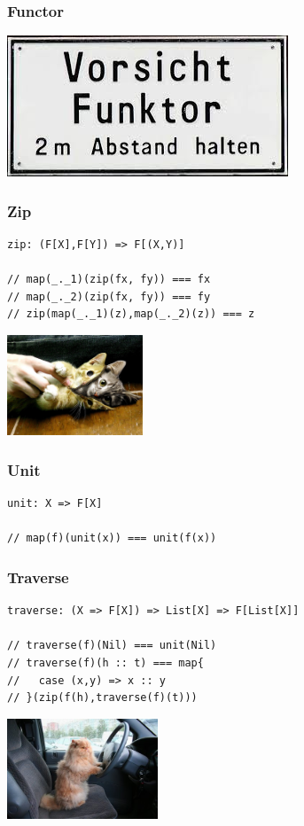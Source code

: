 \documentclass{beamer}
\begin{document}
\begin{frame}
\frametitle{Functor}
\includegraphics{funktor.jpeg}
\end{frame}

\begin{frame}[fragile]
\frametitle{Zip}
\begin{lstlisting}
zip: (F[X],F[Y]) => F[(X,Y)]

// map(_._1)(zip(fx, fy)) === fx
// map(_._2)(zip(fx, fy)) === fy
// zip(map(_._1)(z),map(_._2)(z)) === z
\end{lstlisting}
\begin{center} \includegraphics[height=3cm]{cat_zip.jpg} \end{center}
\end{frame}

\begin{frame}[fragile]
\frametitle{Unit}
\begin{lstlisting}
unit: X => F[X]

// map(f)(unit(x)) === unit(f(x))
\end{lstlisting}
\end{frame}

\begin{frame}[fragile]
\frametitle{Traverse}
\begin{lstlisting}
traverse: (X => F[X]) => List[X] => F[List[X]]

// traverse(f)(Nil) === unit(Nil)
// traverse(f)(h :: t) === map{
//   case (x,y) => x :: y
// }(zip(f(h),traverse(f)(t)))
\end{lstlisting}
\begin{center} \includegraphics[height=3cm]{cat_traverse.jpg} \end{center}
\end{frame}
\end{document}
